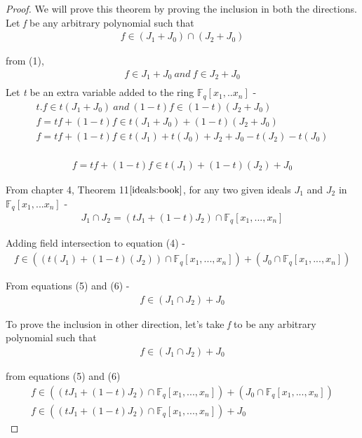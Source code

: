 \documentclass{article}
\newcommand{\Fq}{{\mathbb{F}}_{q}}
\newcommand{\Jo}{J_1}
\newcommand{\Jz}{J_0}
\newcommand{\Jt}{J_2}
\newcommand{\Joz}{J_1 + J_0}
\newcommand{\Jtz}{J_2 + J_0}
\begin{document}
\begin{proof}
We will prove this theorem by proving the inclusion in both the directions.
Let \textit{f} be any arbitrary polynomial such that
\begin{align}
\textit{f} \in (\Joz) \cap (\Jtz)
\end{align} 

\quad from (1),
\begin{align*}
f \in \Joz\ and\ f \in \Jtz\\
\end{align*}
Let \textit{t} be an extra variable added to the ring $\Fq[x_1,..x_n]$ -
\begin{gather*}
t.f \in t(\Joz)\ and\ (1-t)f \in (1-t)(\Jtz)\\
f = tf + (1-t)f \in t(\Joz) + (1-t)(\Jtz)\\
f = tf + (1-t)f \in t(\Jo) + t(\Jz) + \Jt + \Jz -t(\Jt)-t(\Jz)\\
\end{gather*}

\begin{align}
f = tf + (1-t)f \in t(\Jo) + (1-t)(\Jt) + \Jz
\end{align}

From chapter 4, Theorem 11$\cite{ideals:book}$, for any two given ideals $\Jo$ and $\Jt$ in $\Fq[x_1,...x_n]$ -
\begin{align}
\Jo\cap \Jt = (t\Jo+ (1-t)\Jt) \cap \Fq[x_1,...,x_n]
\end{align}

Adding field intersection to equation (4) - 
\begin{align}
f \in ((t(\Jo) + (1-t)(\Jt))\cap \Fq[x_1,...,x_n]) + (\Jz \cap \Fq[x_1,...,x_n])
\end{align}

From equations (5) and (6) -
\begin{align}
\textit{f} \in (\Jo\cap\Jt)+\Jz
\end{align}

To prove the inclusion in other direction, let's take \textit{f} to be any arbitrary polynomial such that
\begin{align}
\textit{f} \in (\Jo\cap\Jt)+\Jz
\end{align}

from equations (5) and (6)
\begin{gather*}
f \in ((t\Jo+ (1-t)\Jt) \cap \Fq[x_1,...,x_n]) + (\Jz \cap \Fq[x_1,...,x_n])\\
f \in ((t\Jo+ (1-t)\Jt) \cap \Fq[x_1,...,x_n]) + \Jz
\end{gather*}


\end{proof}
\end{document}
